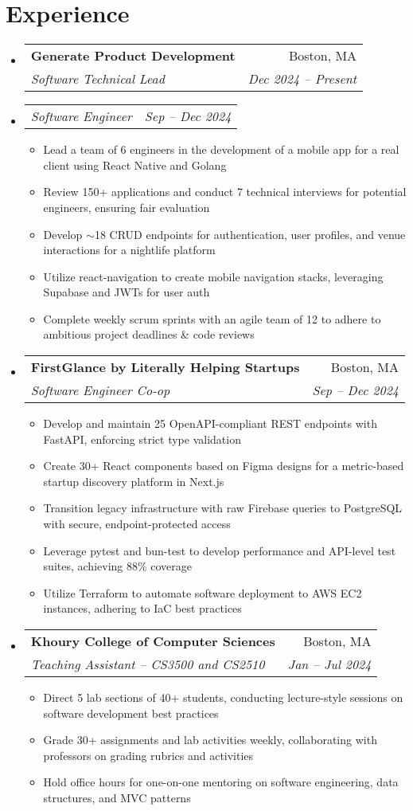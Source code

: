 \documentclass[letterpaper,11pt]{article}
\makeatletter
\newcommand{\resumeItem}[1]{
  \item\small{
    {#1 \vspace{-2pt}}
  }
}
\newcommand{\resumeSubheading}[4]{
  \vspace{-10pt}\item
    \begin{tabular*}{1.0\textwidth}[t]{l@{\extracolsep{\fill}}r}
      \textbf{#1} & \small #2 \\
      \textit{\small#3} & \textit{\small #4} \\
    \end{tabular*}\vspace{-5pt}
}
\newcommand{\resumeSubSubheading}[2]{
    \vspace{-15pt}
    \item
    \begin{tabular*}{1.0\textwidth}{l@{\extracolsep{\fill}}r}
      \textit{\small#1} & \textit{\small #2} \\
    \end{tabular*}\vspace{-5pt}
}
\newcommand{\resumeSubHeadingListStart}{\begin{itemize}[leftmargin=0.0in, label={}]}
\newcommand{\resumeSubHeadingListEnd}{\end{itemize}}
\newcommand{\resumeItemListStart}{\begin{itemize}}
\newcommand{\resumeItemListEnd}{\end{itemize}\vspace{-5pt}}
\makeatother
\begin{document}
\section{Experience}
    \resumeSubHeadingListStart
        \resumeSubheading 
        {Generate Product Development}{Boston, MA}
        {Software Technical Lead}{Dec 2024 – Present}
        \vspace{5pt}
        \resumeSubSubheading {Software Engineer}{Sep – Dec 2024}
        \resumeItemListStart
            \resumeItem{Lead a team of 6 engineers in the development of a mobile app for a real client using React Native and Golang}
            \resumeItem{Review 150+ applications and conduct 7 technical interviews for potential engineers, ensuring fair evaluation}
            \resumeItem{Develop $\sim$18 CRUD endpoints for authentication, user profiles, and venue interactions for a nightlife platform}
            \resumeItem{Utilize react-navigation to create mobile navigation stacks, leveraging Supabase and JWTs for user auth}
            \resumeItem{Complete weekly scrum sprints with an agile team of 12 to adhere to ambitious project deadlines \& code reviews}
        \resumeItemListEnd
        \vspace{10pt}
        \resumeSubheading
        {FirstGlance by Literally Helping Startups}{Boston, MA}
        {Software Engineer Co-op}{Sep – Dec 2024}
        \resumeItemListStart
            \resumeItem{Develop and maintain 25 OpenAPI-compliant REST endpoints with FastAPI, enforcing strict type validation}
            \resumeItem{Create 30+ React components based on Figma designs for a metric-based startup discovery platform in Next.js}
            \resumeItem{Transition legacy infrastructure with raw Firebase queries to PostgreSQL with secure, endpoint-protected access}
            \resumeItem{Leverage pytest and bun-test to develop performance and API-level test suites, achieving 88\% coverage}
            \resumeItem{Utilize Terraform to automate software deployment to AWS EC2 instances, adhering to IaC best practices}
        \resumeItemListEnd
        \vspace{10pt}
        \resumeSubheading
        {Khoury College of Computer Sciences}{Boston, MA}
        {Teaching Assistant – CS3500 and CS2510}{Jan – Jul 2024}
        \resumeItemListStart
            \resumeItem{Direct 5 lab sections of 40+ students, conducting lecture-style sessions on software development best practices}
            \resumeItem{Grade 30+ assignments and lab activities weekly, collaborating with professors on grading rubrics and activities}
            \resumeItem{Hold office hours for one-on-one mentoring on software engineering, data structures, and MVC patterns}
        \resumeItemListEnd
  \resumeSubHeadingListEnd
\end{document}
